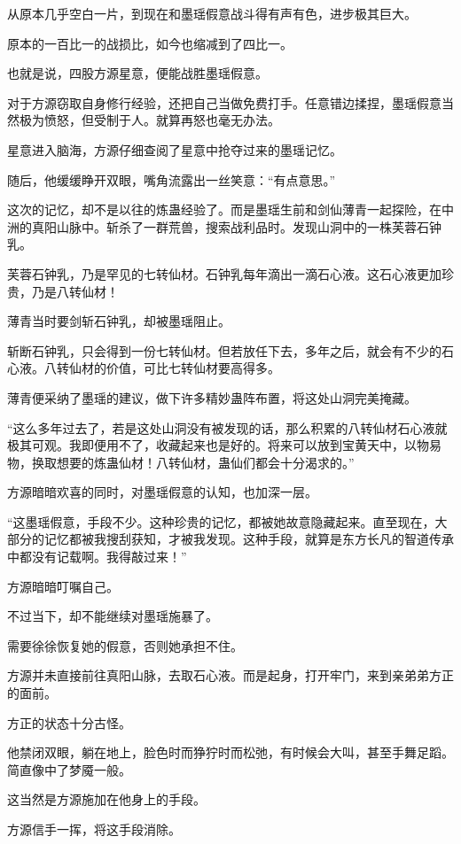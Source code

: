 \begin{this_body}
从原本几乎空白一片，到现在和墨瑶假意战斗得有声有色，进步极其巨大。

原本的一百比一的战损比，如今也缩减到了四比一。

也就是说，四股方源星意，便能战胜墨瑶假意。

对于方源窃取自身修行经验，还把自己当做免费打手。任意错边揉捏，墨瑶假意当然极为愤怒，但受制于人。就算再怒也毫无办法。

星意进入脑海，方源仔细查阅了星意中抢夺过来的墨瑶记忆。

随后，他缓缓睁开双眼，嘴角流露出一丝笑意：“有点意思。”

这次的记忆，却不是以往的炼蛊经验了。而是墨瑶生前和剑仙薄青一起探险，在中洲的真阳山脉中。斩杀了一群荒兽，搜索战利品时。发现山洞中的一株芙蓉石钟乳。

芙蓉石钟乳，乃是罕见的七转仙材。石钟乳每年滴出一滴石心液。这石心液更加珍贵，乃是八转仙材！

薄青当时要剑斩石钟乳，却被墨瑶阻止。

斩断石钟乳，只会得到一份七转仙材。但若放任下去，多年之后，就会有不少的石心液。八转仙材的价值，可比七转仙材要高得多。

薄青便采纳了墨瑶的建议，做下许多精妙蛊阵布置，将这处山洞完美掩藏。

“这么多年过去了，若是这处山洞没有被发现的话，那么积累的八转仙材石心液就极其可观。我即便用不了，收藏起来也是好的。将来可以放到宝黄天中，以物易物，换取想要的炼蛊仙材！八转仙材，蛊仙们都会十分渴求的。”

方源暗暗欢喜的同时，对墨瑶假意的认知，也加深一层。

“这墨瑶假意，手段不少。这种珍贵的记忆，都被她故意隐藏起来。直至现在，大部分的记忆都被我搜刮获知，才被我发现。这种手段，就算是东方长凡的智道传承中都没有记载啊。我得敲过来！”

方源暗暗叮嘱自己。

不过当下，却不能继续对墨瑶施暴了。

需要徐徐恢复她的假意，否则她承担不住。

方源并未直接前往真阳山脉，去取石心液。而是起身，打开牢门，来到亲弟弟方正的面前。

方正的状态十分古怪。

他禁闭双眼，躺在地上，脸色时而狰狞时而松弛，有时候会大叫，甚至手舞足蹈。简直像中了梦魇一般。

这当然是方源施加在他身上的手段。

方源信手一挥，将这手段消除。


\end{this_body}
